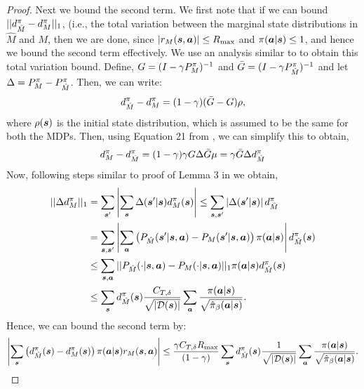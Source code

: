 \begin{proof}
Next we bound the second term. We first note that if we can bound $\vert\vert d^\pi_{\hat{M}} - d^\pi_M \vert\vert_1$, (i.e., the total variation between the marginal state distributions in $\hat{M}$ and $M$, then we are done, since $|r_M(\boldsymbol{s}, \boldsymbol{a})| \leq R_{\max}$ and $\pi(\boldsymbol{a}|\boldsymbol{s}) \leq 1$, and hence we bound the second term effectively. We use an analysis similar to \citet{achiam2017constrained} to obtain this total variation bound. Define, $G = (I - \gamma P^{\pi}_{M})^{-1}$ and $\bar{G} = (I - \gamma P^\pi_{\hat{M}})^{-1}$ and let $\Delta = P^\pi_{M} - P^{\pi}_{\hat{M}}$. Then, we can write:
\begin{equation*}
    d^\pi_{\hat{M}} - d^\pi_{M} = (1 - \gamma) (\bar{G} - G) \rho,
\end{equation*}
where $\rho(\boldsymbol{s})$ is the initial state distribution, which is assumed to be the same for both the MDPs. Then, using Equation 21 from \citet{achiam2017constrained}, we can simplify this to obtain,
\begin{equation*}
    d^\pi_{{M}} - d^\pi_{\hat{M}} = (1 - \gamma) \gamma {G} \Delta \bar{G} \mu = \gamma \bar{G} \Delta d^\pi_{\hat{M}}
\end{equation*}
Now, following steps similar to proof of Lemma 3 in \citet{achiam2017constrained} we obtain,
\begin{align*}
    \vert\vert \Delta d^\pi_M||_{1} &= \sum_{\boldsymbol{s}'} \left\vert \sum_{\boldsymbol{s}} \Delta(\boldsymbol{s}'|\boldsymbol{s}) d^\pi_{M}(\boldsymbol{s}) \right\vert \leq \sum_{\boldsymbol{s}, \boldsymbol{s}'} \left\vert \Delta(\boldsymbol{s}'|\boldsymbol{s}) \right\vert d^\pi_{\hat{M}}\\
    &= \sum_{\boldsymbol{s}, \boldsymbol{s}'} \left\vert \sum_{\boldsymbol{a}} \left(P_{\hat{M}}(\boldsymbol{s}'|\boldsymbol{s}, \boldsymbol{a}) - P_{M}(\boldsymbol{s}'|\boldsymbol{s}, \boldsymbol{a}) \right) \pi(\boldsymbol{a}|\boldsymbol{s}) \right\vert d^\pi_{\hat{M}}(\boldsymbol{s}) \\
    &\leq \sum_{\boldsymbol{s}, \boldsymbol{a}} \vert\vert P_{\hat{M}}(\cdot|\boldsymbol{s}, \boldsymbol{a}) - P_M(\cdot|\boldsymbol{s}, \boldsymbol{a}) \vert\vert_{1} \pi(\boldsymbol{a}|\boldsymbol{s}) d^\pi_{\hat{M}}(\boldsymbol{s})\\
    &\leq \sum_{\boldsymbol{s}} d^\pi_{\hat{M}}(\boldsymbol{s}) \frac{C_{T, \delta}}{\sqrt{|\mathcal{D}(\boldsymbol{s})|}} \sum_{\boldsymbol{a}}  \frac{\pi(\boldsymbol{a}|\boldsymbol{s})}{\sqrt{\hat{\pi}_\beta(\boldsymbol{a}|\boldsymbol{s})}}.
\end{align*}
Hence, we can bound the second term by:
\begin{align*}
    \left\vert \sum_{\boldsymbol{s}} \left(d^\pi_{\hat{M}}(\boldsymbol{s}) - d^\pi_{{M}}(\boldsymbol{s}) \right) \pi(\boldsymbol{a}|\boldsymbol{s}) r_M(\boldsymbol{s}, \boldsymbol{a}) \right\vert \leq \frac{\gamma C_{T, \delta} R_{\max}}{(1 - \gamma)} \sum_{\boldsymbol{s}} d^\pi_{\hat{M}}(\boldsymbol{s}) \frac{1}{\sqrt{|\mathcal{D}(\boldsymbol{s})|}} \sum_{\boldsymbol{a}}  \frac{\pi(\boldsymbol{a}|\boldsymbol{s})}{\sqrt{\hat{\pi}_\beta(\boldsymbol{a}|\boldsymbol{s})}}.
\end{align*}


\end{proof}
